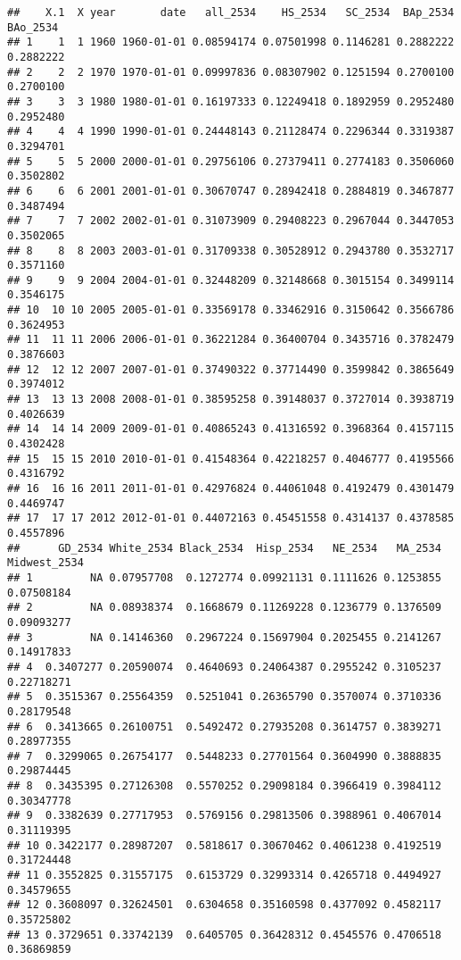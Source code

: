 \documentclass[
]{article}
\begin{document}
\begin{verbatim}
##    X.1  X year       date   all_2534    HS_2534   SC_2534  BAp_2534  BAo_2534
## 1    1  1 1960 1960-01-01 0.08594174 0.07501998 0.1146281 0.2882222 0.2882222
## 2    2  2 1970 1970-01-01 0.09997836 0.08307902 0.1251594 0.2700100 0.2700100
## 3    3  3 1980 1980-01-01 0.16197333 0.12249418 0.1892959 0.2952480 0.2952480
## 4    4  4 1990 1990-01-01 0.24448143 0.21128474 0.2296344 0.3319387 0.3294701
## 5    5  5 2000 2000-01-01 0.29756106 0.27379411 0.2774183 0.3506060 0.3502802
## 6    6  6 2001 2001-01-01 0.30670747 0.28942418 0.2884819 0.3467877 0.3487494
## 7    7  7 2002 2002-01-01 0.31073909 0.29408223 0.2967044 0.3447053 0.3502065
## 8    8  8 2003 2003-01-01 0.31709338 0.30528912 0.2943780 0.3532717 0.3571160
## 9    9  9 2004 2004-01-01 0.32448209 0.32148668 0.3015154 0.3499114 0.3546175
## 10  10 10 2005 2005-01-01 0.33569178 0.33462916 0.3150642 0.3566786 0.3624953
## 11  11 11 2006 2006-01-01 0.36221284 0.36400704 0.3435716 0.3782479 0.3876603
## 12  12 12 2007 2007-01-01 0.37490322 0.37714490 0.3599842 0.3865649 0.3974012
## 13  13 13 2008 2008-01-01 0.38595258 0.39148037 0.3727014 0.3938719 0.4026639
## 14  14 14 2009 2009-01-01 0.40865243 0.41316592 0.3968364 0.4157115 0.4302428
## 15  15 15 2010 2010-01-01 0.41548364 0.42218257 0.4046777 0.4195566 0.4316792
## 16  16 16 2011 2011-01-01 0.42976824 0.44061048 0.4192479 0.4301479 0.4469747
## 17  17 17 2012 2012-01-01 0.44072163 0.45451558 0.4314137 0.4378585 0.4557896
##      GD_2534 White_2534 Black_2534  Hisp_2534   NE_2534   MA_2534 Midwest_2534
## 1         NA 0.07957708  0.1272774 0.09921131 0.1111626 0.1253855   0.07508184
## 2         NA 0.08938374  0.1668679 0.11269228 0.1236779 0.1376509   0.09093277
## 3         NA 0.14146360  0.2967224 0.15697904 0.2025455 0.2141267   0.14917833
## 4  0.3407277 0.20590074  0.4640693 0.24064387 0.2955242 0.3105237   0.22718271
## 5  0.3515367 0.25564359  0.5251041 0.26365790 0.3570074 0.3710336   0.28179548
## 6  0.3413665 0.26100751  0.5492472 0.27935208 0.3614757 0.3839271   0.28977355
## 7  0.3299065 0.26754177  0.5448233 0.27701564 0.3604990 0.3888835   0.29874445
## 8  0.3435395 0.27126308  0.5570252 0.29098184 0.3966419 0.3984112   0.30347778
## 9  0.3382639 0.27717953  0.5769156 0.29813506 0.3988961 0.4067014   0.31119395
## 10 0.3422177 0.28987207  0.5818617 0.30670462 0.4061238 0.4192519   0.31724448
## 11 0.3552825 0.31557175  0.6153729 0.32993314 0.4265718 0.4494927   0.34579655
## 12 0.3608097 0.32624501  0.6304658 0.35160598 0.4377092 0.4582117   0.35725802
## 13 0.3729651 0.33742139  0.6405705 0.36428312 0.4545576 0.4706518   0.36869859

\end{verbatim}
\end{document}
